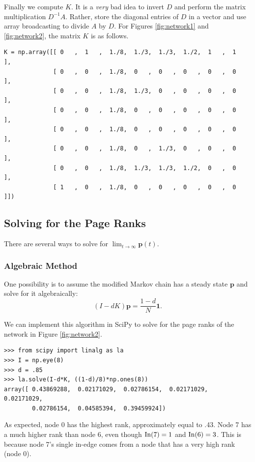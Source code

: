 Finally we compute $K$.
It is a \emph{very} bad idea to invert $D$ and perform the matrix multiplication $D^{-1}A$.
Rather, store the diagonal entries of $D$ in a vector and use array broadcasting to divide $A$ by $D$.
For Figures \ref{fig:network1} and \ref{fig:network2}, the matrix $K$ is as follows.

\begin{lstlisting}
K = np.array([[ 0   ,  1   ,  1./8,  1./3,  1./3,  1./2,  1   ,  1   ],
              [ 0   ,  0   ,  1./8,  0   ,  0   ,  0   ,  0   ,  0   ],
              [ 0   ,  0   ,  1./8,  1./3,  0   ,  0   ,  0   ,  0   ],
              [ 0   ,  0   ,  1./8,  0   ,  0   ,  0   ,  0   ,  0   ],
              [ 0   ,  0   ,  1./8,  0   ,  0   ,  0   ,  0   ,  0   ],
              [ 0   ,  0   ,  1./8,  0   ,  1./3,  0   ,  0   ,  0   ],
              [ 0   ,  0   ,  1./8,  1./3,  1./3,  1./2,  0   ,  0   ],
              [ 1   ,  0   ,  1./8,  0   ,  0   ,  0   ,  0   ,  0   ]])
\end{lstlisting}


\subsection*{Solving for the Page Ranks}
There are several ways to solve for $\lim_{t \to \infty} \mathbf{p}(t)$.
\subsubsection*{Algebraic Method}
One possibility is to assume the modified Markov chain has a steady state $\mathbf{p}$ and solve for it algebraically:
\begin{equation}\label{equ:matrix_solve}
(I-dK)\mathbf{p} = \frac{1-d}{N} \mathbf{1}.
\end{equation}

We can implement this algorithm in SciPy to solve for the page ranks of the network in Figure \ref{fig:network2}.
\begin{lstlisting}
>>> from scipy import linalg as la
>>> I = np.eye(8)
>>> d = .85
>>> la.solve(I-d*K, ((1-d)/8)*np.ones(8))
array([ 0.43869288,  0.02171029,  0.02786154,  0.02171029,  0.02171029,
        0.02786154,  0.04585394,  0.39459924])
\end{lstlisting}
As expected, node 0 has the highest rank, approximately equal to .43. 
Node 7 has a much higher rank than node 6, even though $\operatorname{In}(7)=1$ and $\operatorname{In}(6)=3$. 
This is because node 7's single in-edge comes from a node that has a very high rank (node 0).

